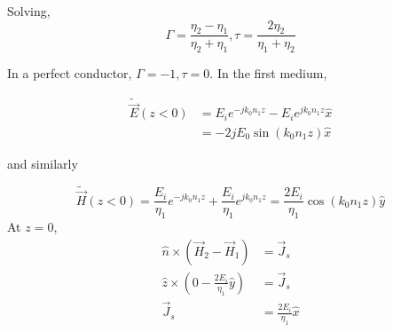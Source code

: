 \documentclass[12pt]{article}
\begin{document}
Solving,
$$\Gamma = \frac{\eta_2-\eta_1}{\eta_2+\eta_1}, \tau = \frac{2\eta_2}{\eta_1 + \eta_2}$$

In a perfect conductor, $\Gamma = -1, \tau = 0$. In the first medium,

\begin{align*}
    \tilde{\vec E}(z < 0) &= E_ie^{-jk_0n_1z} - E_ie^{jk_0n_1z} \hat x \\
                          &= -2jE_0\sin(k_0n_1z) \hat x
\end{align*}

and similarly

$$\tilde{\vec H}(z < 0) = \frac{E_i}{\eta_1} e^{-jk_0n_1z} + \frac{E_i}{\eta_1} e^{jk_0n_1z} = \frac{2E_i}{\eta_1}\cos(k_0n_1z) \hat y$$
At $z = 0$,
\begin{align*}
    \hat n \times (\vec H_2 - \vec H_1) &= \vec J_s \\
    \hat z \times (0 - \frac{2E_i}{\eta_1} \hat y) &= \vec J_s \\
    \vec J_s &= \frac{2E_i}{\eta_1} \hat x
\end{align*}
\end{document}
